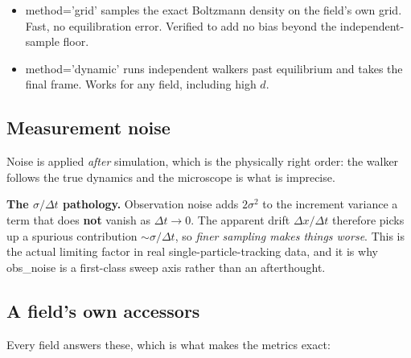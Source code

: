 \documentclass[11pt,a4paper]{article}
\newcommand{\code}[1]{{\ttfamily\small #1}}
\begin{document}
\begin{itemize}[leftmargin=1.4em,itemsep=1pt]
  \item \code{method='grid'} \textemdash{} samples the exact Boltzmann density on the
        field's own grid. Fast, no equilibration error. Verified to add no bias beyond
        the independent-sample floor.
  \item \code{method='dynamic'} \textemdash{} runs independent walkers past equilibrium
        and takes the final frame. Works for any field, including high $d$.
\end{itemize}

\subsection{Measurement noise}

Noise is applied \emph{after} simulation, which is the physically right order: the
walker follows the true dynamics and the microscope is what is imprecise.

\begin{warnbox}
\textbf{The $\sigma/\Delta t$ pathology.} Observation noise adds $2\sigma^2$ to the
increment variance \textemdash{} a term that does \textbf{not} vanish as
$\Delta t\to0$. The apparent drift $\Delta x/\Delta t$ therefore picks up a spurious
contribution $\sim\sigma/\Delta t$, so \emph{finer sampling makes things worse}. This is
the actual limiting factor in real single-particle-tracking data, and it is why
\code{obs\_noise} is a first-class sweep axis rather than an afterthought.
\end{warnbox}

\subsection{A field's own accessors}

Every field answers these, which is what makes the metrics exact:
\end{document}
